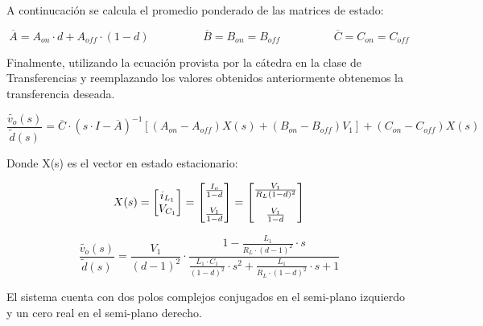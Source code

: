 \documentclass[e4_tp2_main.tex]{subfiles}
\begin{document}
A continucaci\'on se calcula el promedio ponderado de las matrices de estado:

\begin{equation}
\overline{A} = A_{on} \cdot d + A_{off} \cdot (1-d) \hspace{2cm} \overline{B}=B_{on} = B_{off}  \hspace{2cm} \overline{C}=C_{on} = C_{off}  
\end{equation}

Finalmente, utilizando la ecuaci\'on provista por la c\'atedra en la clase de Transferencias y reemplazando los valores obtenidos anteriormente obtenemos la transferencia deseada. 

\begin{equation}
\frac{ \widetilde{v_o}(s)}{\widetilde{d}(s)}= \overline{C} \cdot (s \cdot I - \overline{A})^{-1} \left[ (A_{on} - A_{off})X(s) + (B_{on} - B_{off}) V_1 \right] +(C_{on} - C_{off})X(s) 
\label{ec1.3}
\end{equation}

Donde X(s) es el vector en estado estacionario:

\begin{equation}
X(s)= 
\begin{bmatrix}
{i_{L_1}} \\
{V_{C_1}} 
\end{bmatrix}
=
\begin{bmatrix}
{\frac{I_o}{1-d}} \vspace{0.3cm} \\
{\frac{V_1}{1-d}} 
\end{bmatrix}
=
\begin{bmatrix}
{\frac{V_1}{R_L(1-d)^2}} \vspace{0.3cm} \\
{\frac{V_1}{1-d}} 
\end{bmatrix}
\end{equation}

\vspace{0.5cm}

\begin{equation}
\frac{ \widetilde{v_o}(s)}{\widetilde{d}(s)}= \frac{V_1}{(d-1)^2} \cdot
 \frac{ 1 - \frac{L_1}{R_L \cdot (d-1)^2} \cdot s}{ \frac{L_1 \cdot C_1}{(1-d)^2} \cdot s^2 +\frac{L_1}{R_L \cdot (1-d)^2 }\cdot s + 1}
\end{equation}

El sistema cuenta con dos polos complejos conjugados en el semi-plano izquierdo y un cero real en el semi-plano derecho.
\end{document}
